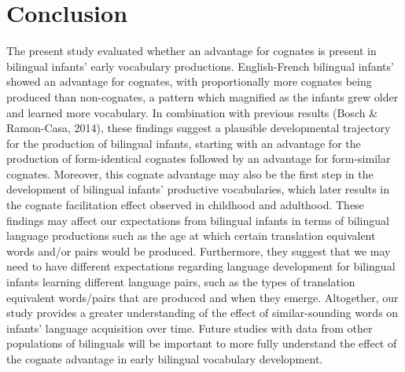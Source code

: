 \documentclass[
  english,
  ,man,floatsintext]{apa6}
\begin{document}
\hypertarget{conclusion}{%
\section{Conclusion}\label{conclusion}}

The present study evaluated whether an advantage for cognates is present in bilingual infants' early vocabulary productions. English-French bilingual infants' showed an advantage for cognates, with proportionally more cognates being produced than non-cognates, a pattern which magnified as the infants grew older and learned more vocabulary. In combination with previous results (Bosch \& Ramon-Casa, 2014), these findings suggest a plausible developmental trajectory for the production of bilingual infants, starting with an advantage for the production of form-identical cognates followed by an advantage for form-similar cognates. Moreover, this cognate advantage may also be the first step in the development of bilingual infants' productive vocabularies, which later results in the cognate facilitation effect observed in childhood and adulthood. These findings may affect our expectations from bilingual infants in terms of bilingual language productions such as the age at which certain translation equivalent words and/or pairs would be produced. Furthermore, they suggest that we may need to have different expectations regarding language development for bilingual infants learning different language pairs, such as the types of translation equivalent words/pairs that are produced and when they emerge. Altogether, our study provides a greater understanding of the effect of similar-sounding words on infants' language acquisition over time. Future studies with data from other populations of bilinguals will be important to more fully understand the effect of the cognate advantage in early bilingual vocabulary development.
\end{document}
